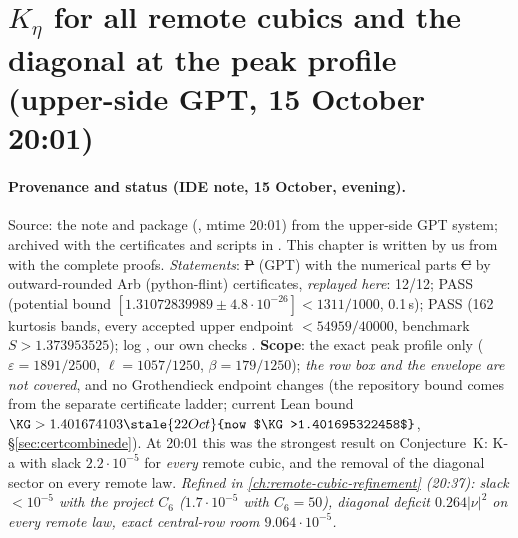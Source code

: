 \section{$K_\eta$ for all remote cubics and the diagonal at the peak profile (upper-side GPT, 15 October 20:01)}\label{ch:rescub}

\paragraph{Provenance and status (IDE note, 15 October, evening).} Source: the note  and package 
(, mtime 20:01) from the upper-side GPT system; archived with the certificates and scripts in .
This chapter is written by us from  with the complete proofs. \emph{Statements}: \st{P} (GPT) with the numerical parts \st{C} by outward-rounded Arb (python-flint) certificates,
\emph{replayed here}:  12/12;  PASS (potential bound $[1.31072839989\pm4.8\cdot10^{-26}]<1311/1000$, 0.1\,s); 
PASS (162 kurtosis bands, every accepted upper endpoint $<54959/40000$, benchmark $S>1.373953525$); log , our own checks
. \textbf{Scope}: the exact peak profile only ($\varepsilon=1891/2500$, $\ell=1057/1250$, $\beta=179/1250$); \emph{the row box and the envelope are not covered}, and no
Grothendieck endpoint changes (the repository bound comes from the separate certificate ladder; current Lean bound $\KG>1.401674103\stale{22 Oct}{now $\KG>1.401695322458$}$, \S\ref{sec:certcombinede}).
At 20:01 this was the strongest result on Conjecture~K: K-a with slack $2.2\cdot10^{-5}$ for \emph{every} remote cubic, and the removal of the diagonal sector on every remote law. \emph{Refined in \autoref{ch:remote-cubic-refinement} (20:37): slack $<10^{-5}$ with the project $C_6$ ($1.7\cdot10^{-5}$ with $C_6=50$), diagonal deficit $0.264|\nu|^2$ on every remote law, exact central-row room $9.064\cdot10^{-5}$.}

